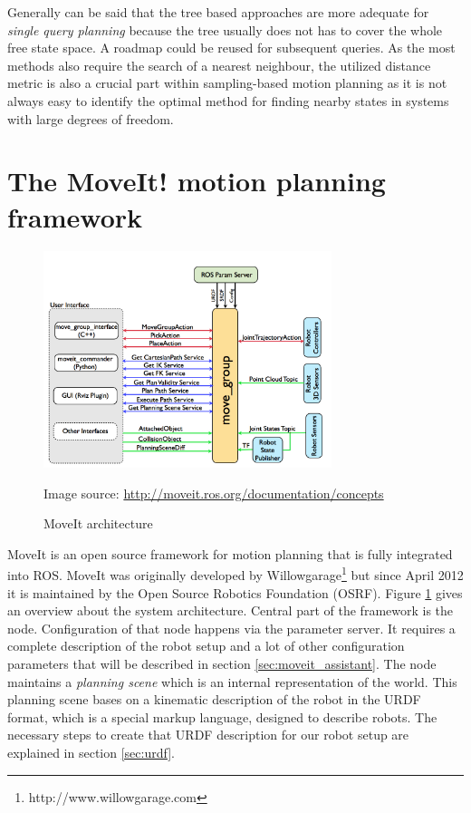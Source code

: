 Generally can be said that the tree based approaches are more adequate for \emph{single query planning} because the tree usually does not has to cover the whole free state space. A roadmap could be reused for subsequent queries. As the most methods also require the search of a nearest neighbour, the utilized distance metric is also a crucial part within sampling-based motion planning as it is not always easy to identify the optimal method for finding nearby states in systems with large degrees of freedom.  

\section{The MoveIt! motion planning framework}

\begin{figure}[ht]
	\centering
	\includegraphics[width=0.75\textwidth]{images/moveit_architecture.jpg}
	\caption[Moveit architecture]{MoveIt architecture}
	{\scriptsize Image source: \url{http://moveit.ros.org/documentation/concepts}}
	\label{fig:moveit_arch}
\end{figure}

MoveIt\citep{MoveIt} is an open source framework for motion planning that is fully integrated into ROS. MoveIt was originally developed by Willowgarage\footnote{http://www.willowgarage.com} but since April 2012 it is maintained by the Open Source Robotics Foundation (OSRF). Figure \ref{fig:moveit_arch} gives an overview about the system architecture. Central part of the framework is the  node. Configuration of that node happens via the parameter server. It requires a complete description of the robot setup and a lot of other configuration parameters that will be described in section \ref{sec:moveit_assistant}. The  node maintains a \emph{planning scene} which is an internal representation of the world. This planning scene bases on a kinematic description of the robot in the URDF format, which is a special markup language, designed to describe robots. The necessary steps to create that URDF description for our robot setup are explained in section \ref{sec:urdf}. \\

